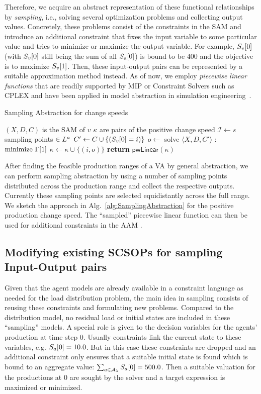 \documentclass[conference]{IEEEtran}
\newcommand{\aref}[1]{Alg.~\ref{#1}}
\begin{document}
Therefore, we acquire an abstract representation of these functional relationships by \emph{sampling}, i.e., solving several optimization problems and collecting output values. Concretely, these problems consist of the constraints in the SAM and introduce an additional constraint that fixes the input variable to some particular value and tries to minimize or maximize the output variable. For example, $\AgentPower{0}{v}$ (with  $\AgentPower{0}{v}$ still being the sum of all $\AgentPower{0}{a}$) is bound to be $400$ and the objective is to maximize $\AgentPower{1}{v}$.  Then, these input-output pairs can be represented by a suitable approximation method instead. As of now, we employ \emph{piecewise linear functions} that are readily supported by MIP or Constraint Solvers such as CPLEX and have been applied in model abstraction in simulation engineering~\cite{Frantz_Taxonomy}.
%
\begin{algorithm}
\caption{Sampling Abstraction for change speeds}\label{alg:SamplingAbstraction}
\begin{algorithmic}[1]
\Require $(X, D, C)$ is the SAM of $v$
\Ensure $\kappa$ are pairs of the positive change speed
\State $\mathcal{I} \gets s$ sampling points $\in \ListSym^a$
\State $C' \gets C \cup \{(\AgentPower{0}{v} = i)\}$
\State $o \gets $ solve $\langle X, D, C'\rangle$ : $\text{minimize } \CostsObjective[1]$
\State $\kappa \gets \kappa \cup \{(i,o)\}$
\EndFor
\State \textbf{return} $\mathsf{pwLinear}(\kappa)$ 
\EndProcedure
\end{algorithmic}
\end{algorithm}
%
After finding the feasible production ranges of a VA by general abstraction, we can perform sampling abstraction by using a number of sampling points distributed across the production range and collect the respective outputs. Currently these sampling points are selected equidistantly across the full range. We sketch the approach in \aref{alg:SamplingAbstraction} for the positive production change speed. The ``sampled'' piecewise linear function can then be used for additional constraints in the AAM .
\subsection{Modifying existing SCSOPs for sampling Input-Output pairs}
Given that the agent models are already available in a constraint language as needed for the load distribution problem, the main idea in sampling consists of reusing these constraints and formulating new problems. Compared to the distribution model, no residual load or initial states are included in these ``sampling'' models. A special role is given to the decision variables for the agents' production at time step 0. Usually constraints link the current state to these variables, e.g. $\AgentPower{0}{a} = 10.0$. But in this case these constraints are dropped and an additional constraint only ensures that a suitable initial state is found which is bound to an aggregate value: $\sum_{a \in \Subsystem} \AgentPower{0}{a} = 500.0$. Then a suitable valuation for the productions at $0$ are sought by the solver and a target expression is maximized or minimized.
\end{document}
